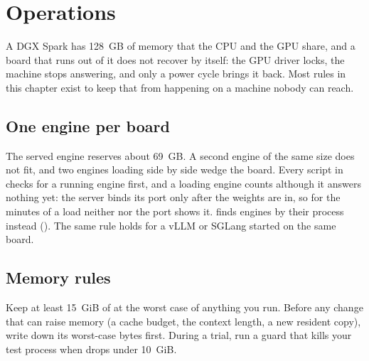\chapter{Operations}\label{ch:operations}

A DGX Spark has 128~GB of memory that the CPU and the GPU share, and a board that runs out of it does not recover by itself: the GPU driver locks, the machine stops answering, and only a power cycle brings it back. Most rules in this chapter exist to keep that from happening on a machine nobody can reach.

\section{One engine per board}\label{sec:one-engine}

The served engine reserves about 69~GB. A second engine of the same size does not fit, and two engines loading side by side wedge the board. Every script in  checks for a running engine first, and a loading engine counts although it answers nothing yet: the server binds its port only after the weights are in, so for the minutes of a load neither  nor the port shows it.  finds engines by their process instead (). The same rule holds for a vLLM or SGLang started on the same board.

\section{Memory rules}

Keep at least 15~GiB of  at the worst case of anything you run. Before any change that can raise memory (a cache budget, the context length, a new resident copy), write down its worst-case bytes first. During a trial, run a guard that kills your test process when  drops under 10~GiB.


